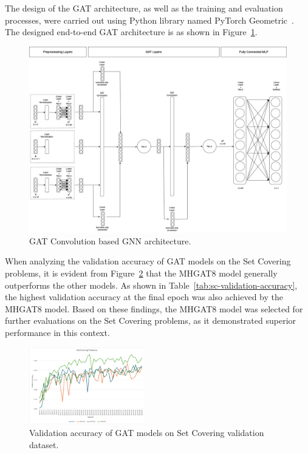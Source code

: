 The design of the GAT architecture, as well as the training and evaluation processes, were carried out using Python library named PyTorch Geometric~\cite{feyFastGraphRepresentation2019}.
The designed end-to-end GAT architecture is as shown in Figure~\ref{fig:gat}.


\begin{figure}[htb!]
    \centering
    \includegraphics[width=1\textwidth]{figures/GAT}
    \caption{GAT Convolution based GNN architecture.}
    \label{fig:gat}
\end{figure}

When analyzing the validation accuracy of GAT models on the Set Covering problems, it is evident from Figure~\ref{fig:sc-validation-accuracy} that the MHGAT8 model generally outperforms the other models.
As shown in Table~\ref{tab:sc-validation-accuracy}, the highest validation accuracy at the final epoch was also achieved by the MHGAT8 model.
Based on these findings, the MHGAT8 model was selected for further evaluations on the Set Covering problems, as it demonstrated superior performance in this context.



\begin{figure}[htb!]
    \centering
    \includegraphics[width=0.45\textwidth]{figures/SC Validation Accuracy}
    \caption{Validation accuracy of GAT models on Set Covering validation dataset.}
    \label{fig:sc-validation-accuracy}
\end{figure}


